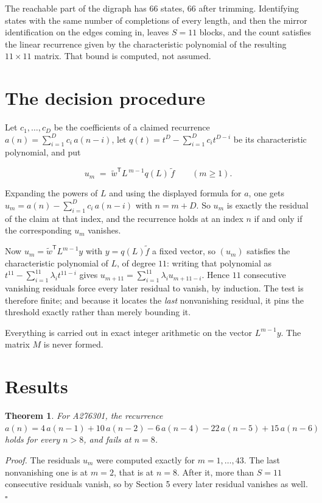 \documentclass[11pt]{article}
\newtheorem{theorem}{Theorem}
\theoremstyle{definition}
\begin{document}
The reachable part of the digraph has $66$ states, $66$ after trimming. Identifying states with the same number of completions of every length, and then the mirror identification on the edges coming in, leaves $S = 11$ blocks, and the count satisfies the linear recurrence given by the characteristic polynomial of the resulting $11\times11$ matrix. That bound is computed, not assumed.

\section{The decision procedure}

Let $c_1,\dots,c_D$ be the coefficients of a claimed recurrence $a(n) = \sum_{i=1}^{D} c_i\,a(n-i)$, let $q(t) = t^{D} - \sum_{i=1}^{D} c_i t^{D-i}$ be its characteristic polynomial, and put

\[u_m \;=\; \tilde w^{\mathsf T} L^{\,m-1} q(L)\,\tilde f \qquad (m \ge 1).\]

Expanding the powers of $L$ and using the displayed formula for $a$, one gets $u_m = a(n) - \sum_{i=1}^{D} c_i\,a(n-i)$ with $n = m + D$. So $u_m$ is exactly the residual of the claim at that index, and the recurrence holds at an index $n$ if and only if the corresponding $u_m$ vanishes.

Now $u_m = \tilde w^{\mathsf T} L^{m-1} y$ with $y = q(L)\tilde f$ a fixed vector, so $(u_m)$ satisfies the characteristic polynomial of $L$, of degree $11$: writing that polynomial as $t^{11} - \sum_{i=1}^{11} \lambda_i t^{11-i}$ gives $u_{m+11} = \sum_{i=1}^{11} \lambda_i u_{m+11-i}$. Hence $11$ consecutive vanishing residuals force every later residual to vanish, by induction. The test is therefore finite; and because it locates the {\itshape last} nonvanishing residual, it pins the threshold exactly rather than merely bounding it.

Everything is carried out in exact integer arithmetic on the vector $L^{m-1}y$. The matrix $M$ is never formed.

\section{Results}

\begin{theorem} For A276301, the recurrence $a(n) = 4\,a(n-1) + 10\,a(n-2) - 6\,a(n-4) - 22\,a(n-5) + 15\,a(n-6)$ holds for every $n > 8$, and fails at $n = 8$.\end{theorem}

{\itshape Proof.} The residuals $u_m$ were computed exactly for $m = 1,\dots,43$. The last nonvanishing one is at $m = 2$, that is at $n = 8$. After it, more than $S = 11$ consecutive residuals vanish, so by Section 5 every later residual vanishes as well. $\square$
\end{document}

